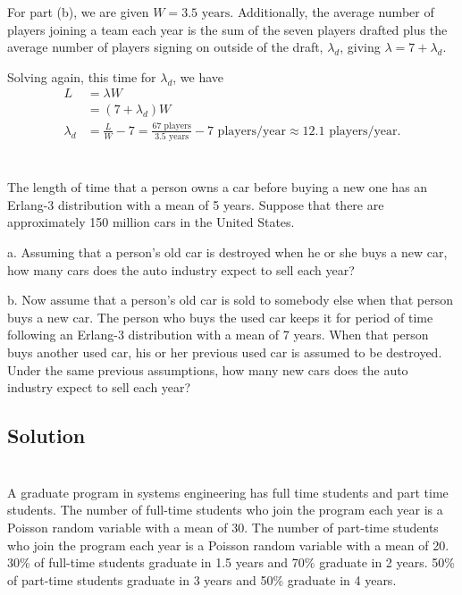 \documentclass{amsart}
\begin{document}
For part (b), we are given $W = 3.5 \text{ years}$. Additionally, the average
number of players joining a team each year is the sum of the seven players
drafted plus the average number of players signing on outside of the draft,
$\lambda_d$, giving $\lambda = 7+\lambda_d$.

Solving again, this time for $\lambda_d$, we have
\begin{align}
  L &= \lambda W \\
    &= (7 + \lambda_d) W \\
  \lambda_d &= \frac{L}{W}-7 = \frac{67 \text{ players}}{3.5 \text{ years}}
              - 7\text{ players/year}\approx 12.1\text{ players/year}.
\end{align}

\section{} %
The length of time that a person owns a car before buying a new one has an Erlang-3
distribution with a mean of 5 years. Suppose that there are approximately 150 million
cars in the United States.

a. Assuming that a person's old car is destroyed when he or she buys a new car,
how many cars does the auto industry expect to sell each year?

b. Now assume that a person's old car is sold to somebody else when that person
buys a new car. The person who buys the used car keeps it for period of time
following an Erlang-3 distribution with a mean of 7 years. When that person buys
another used car, his or her previous used car is assumed to be destroyed. Under
the same previous assumptions, how many new cars does the auto industry
expect to sell each year?

\subsection*{Solution}

\section{} %
A graduate program in systems engineering has full time students and part time students.
The number of full-time students who join the program each year is a Poisson random
variable with a mean of 30. The number of part-time students who join the program each
year is a Poisson random variable with a mean of 20. 30\% of full-time students graduate
in 1.5 years and 70\% graduate in 2 years. 50\% of part-time students graduate in 3 years
and 50\% graduate in 4 years.
\end{document}
